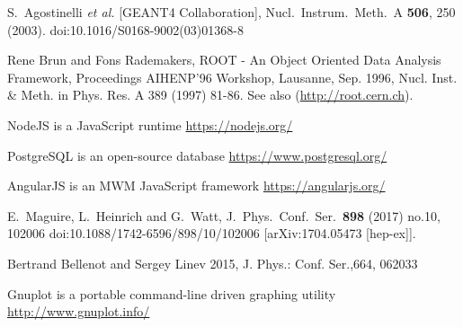 \begin{thebibliography}{}
%
%
S.~Agostinelli {\it et al.} [GEANT4 Collaboration],
  Nucl.\ Instrum.\ Meth.\ A {\bf 506}, 250 (2003).
  doi:10.1016/S0168-9002(03)01368-8

    Rene Brun and Fons Rademakers,
    ROOT - An Object Oriented Data Analysis Framework,
    Proceedings AIHENP'96 Workshop, Lausanne, Sep. 1996, Nucl. Inst. \& Meth. in Phys. Res. A 389 (1997) 81-86. See also (\url{http://root.cern.ch}).

NodeJS is a JavaScript runtime \url{https://nodejs.org/}

PostgreSQL is an open-source database \url{https://www.postgresql.org/}

AngularJS is an MWM JavaScript framework \url{https://angularjs.org/}

  E.~Maguire, L.~Heinrich and G.~Watt,
  J.\ Phys.\ Conf.\ Ser.\  {\bf 898} (2017) no.10,  102006
  doi:10.1088/1742-6596/898/10/102006
  [arXiv:1704.05473 [hep-ex]].


Bertrand Bellenot and Sergey Linev 2015, J. Phys.: Conf. Ser.,664,  062033

Gnuplot is a portable command-line driven graphing utility \url{http://www.gnuplot.info/}

\end{thebibliography}